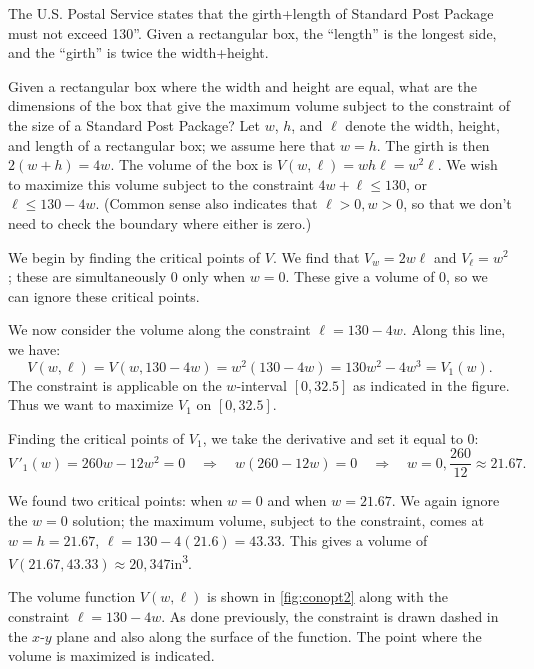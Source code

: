 \begin{example}\label{ex_conopt2}
The U.S. Postal Service states that the girth+length of Standard Post Package must not exceed 130''. Given a rectangular box, the ``length'' is the longest side, and the ``girth'' is twice the width+height.

Given a rectangular box where the width and height are equal, what are the dimensions of the box that give the maximum volume subject to the constraint of the size of a Standard Post Package?
\solution
Let $w$, $h$, and $\ell$ denote the width, height, and length of a rectangular box; we assume here that $w=h$. The girth is then $2(w+h) = 4w$. The volume of the box is $V(w,\ell) = wh\ell = w^2\ell$. We wish to maximize this volume subject to the constraint $4w+\ell\leq 130$, or $\ell\leq 130-4w$. (Common sense also indicates that $\ell>0, w>0$, so that we don't need to check the boundary where either is zero.)

We begin by finding the critical points of $V$. We find that $V_w = 2w\ell$ and $V_\ell = w^2$; these are simultaneously 0 only when $w=0$. These give a volume of 0, so we can ignore these critical points. 

We now consider the volume along the constraint $\ell=130-4w.$ Along this line, we have:
\[V(w,\ell) = V(w,130-4w) = w^2(130-4w) = 130w^2-4w^3 = V_1(w).\]
The constraint is applicable on the $w$-interval $[0,32.5]$ as indicated in the figure. Thus we want to maximize $V_1$ on $[0,32.5]$. 

Finding the critical points of $V_1$, we take the derivative and set it equal to 0:
\[V\,'_1(w) = 260w-12w^2 = 0 \quad \Rightarrow \quad w(260-12w)= 0 \quad \Rightarrow \quad w=0,\frac{260}{12}\approx 21.67.\]

We found two critical points: when $w=0$ and when $w=21.67$. We again ignore the $w=0$ solution; the maximum volume, subject to the constraint, comes at $w=h=21.67$, $\ell = 130-4(21.6) =43.33.$ This gives a volume of $V(21.67,43.33) \approx 20{,}347$in\textsuperscript3. 


The volume function $V(w,\ell)$ is shown in \autoref{fig:conopt2} along with the constraint $\ell = 130-4w$. As done previously, the constraint is drawn dashed in the $x$-$y$ plane and also along the surface of the function. The point where the volume is maximized is indicated.
\end{example}

